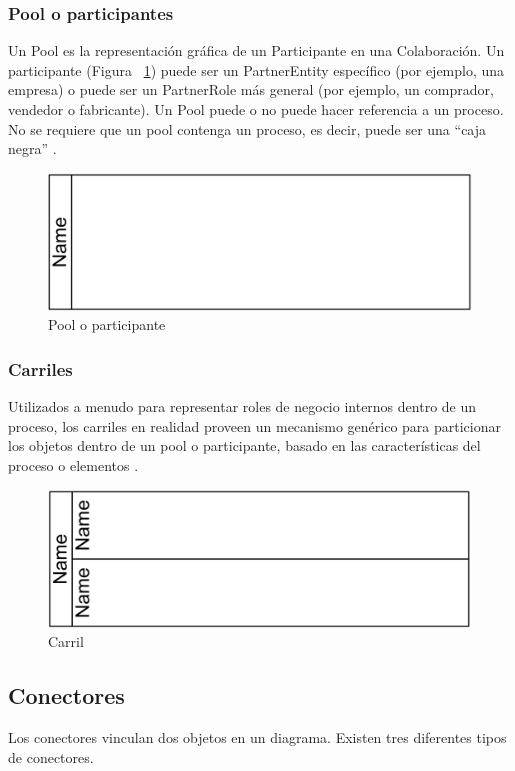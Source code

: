 \subsubsection{Pool o participantes}
Un Pool es la representación gráfica de un Participante en una Colaboración. Un participante (Figura ~\ref{Pool}) puede ser un PartnerEntity específico (por ejemplo, una empresa) o puede ser un PartnerRole más general (por ejemplo, un comprador, vendedor o fabricante). Un Pool puede o no puede hacer referencia a un proceso. No se requiere que un pool contenga un proceso, es decir, puede ser una “caja negra” \citep{VonRosing2014}.
\begin{figure}[H]
	\centering
	\includegraphics[scale=0.2]{Capitulo2/imagenes/Pool}
	\caption{Pool o participante}
	\label{Pool}
\end{figure}

\subsubsection{Carriles}
Utilizados a menudo para representar roles de negocio internos dentro de un proceso, los carriles en realidad proveen un mecanismo genérico para particionar los objetos dentro de un pool o participante, basado en las características del proceso o elementos \citep{stephena2009}.
\begin{figure}[H]
	\centering
	\includegraphics[scale=0.2]{Capitulo2/imagenes/Carril}
	\caption{Carril}
	\label{Carril}
\end{figure}

\subsection{Conectores}
Los conectores vinculan dos objetos en un diagrama. Existen tres diferentes tipos de conectores.

